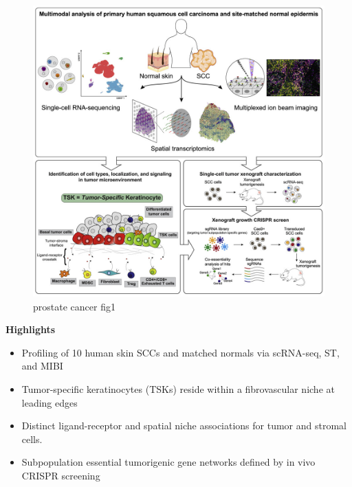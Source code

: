 \documentclass[
]{book}
\begin{document}
\begin{figure}
\centering
\includegraphics{./figs/spatialDatasets/Skin Graphical Abstract.jpg}
\caption{prostate cancer fig1}
\end{figure}

\textbf{Highlights}

\begin{itemize}
\item
  Profiling of 10 human skin SCCs and matched normals via scRNA-seq, ST, and MIBI
\item
  Tumor-specific keratinocytes (TSKs) reside within a fibrovascular niche at leading edges
\item
  Distinct ligand-receptor and spatial niche associations for tumor and stromal cells.
\item
  Subpopulation essential tumorigenic gene networks defined by in vivo CRISPR screening
\end{itemize}
\end{document}
